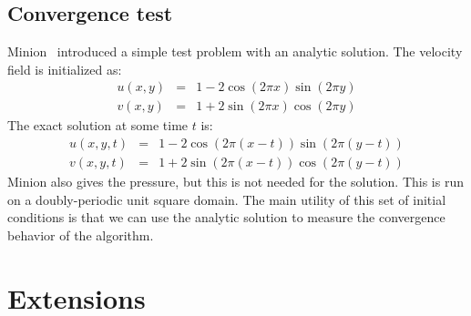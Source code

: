 \subsection{Convergence test}

Minion~\cite{minion:1996} introduced a simple test problem with an analytic solution.
The velocity field is initialized as:
\begin{eqnarray}
u(x,y) &=& 1 - 2 \cos(2 \pi x) \sin(2 \pi y) \\
v(x,y) &=& 1 + 2 \sin(2 \pi x) \cos(2 \pi y)
\end{eqnarray}
The exact solution at some time $t$ is:
\begin{eqnarray}
u(x,y,t) &=& 1 - 2 \cos(2 \pi (x - t)) \sin(2 \pi (y - t)) \\
v(x,y,t) &=& 1 + 2 \sin(2 \pi (x - t)) \cos(2 \pi (y - t))
\end{eqnarray}
Minion also gives the pressure, but this is not needed for the
solution.  This is run on a doubly-periodic unit square domain.  The
main utility of this set of initial conditions is that we can use the
analytic solution to measure the convergence behavior of the
algorithm.


\section{Extensions}

